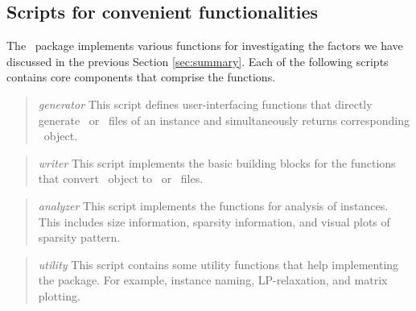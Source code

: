 \subsection{Scripts for convenient functionalities}
The \siplibtwo\ package implements various functions for investigating the factors we have discussed in the previous Section \ref{sec:summary}. Each of the following scripts contains core components that comprise the functions.
\begin{quotation}
	\noindent\textit{generator} This script defines user-interfacing functions that directly generate \smps\ or \mps\ files of an instance and simultaneously returns corresponding \jumpmodel\ object.
\end{quotation}

\begin{quotation}
	\noindent\textit{writer} This script implements the basic building blocks for the functions that convert \jumpmodel\ object to \smps\ or \mps\ files. 
\end{quotation}


\begin{quotation}
	\noindent\textit{analyzer} This script implements the functions for analysis of instances. This includes size information, sparsity information, and visual plots of sparsity pattern.
\end{quotation}

\begin{quotation}
	\noindent\textit{utility} This script contains some utility functions that help implementing the package. For example, instance naming, LP-relaxation, and matrix plotting.
\end{quotation}



